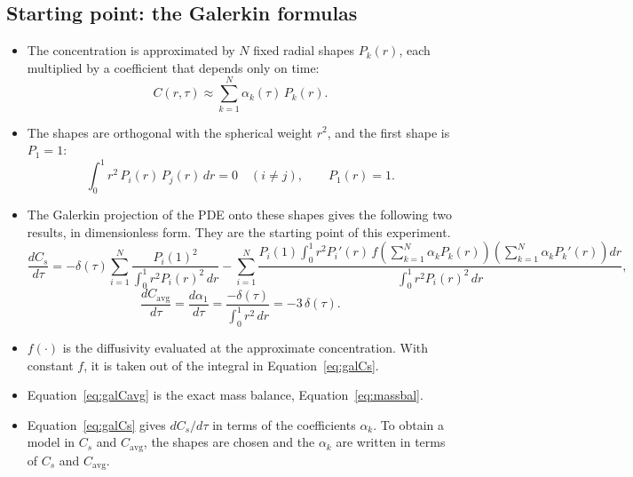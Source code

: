 \documentclass[11pt,a4paper]{article}
\newcommand{\avg}{\mathrm{avg}}
\begin{document}
\subsection{Starting point: the Galerkin formulas}
\begin{itemize}
  \item The concentration is approximated by $N$ fixed radial shapes $P_k(r)$, each multiplied by a coefficient that depends only on time:
  \begin{equation}
    C(r,\tau)\approx\sum_{k=1}^{N}\alpha_k(\tau)\,P_k(r).
  \end{equation}
  \item The shapes are orthogonal with the spherical weight $r^2$, and the first shape is $P_1=1$:
  \begin{equation}\label{eq:orth}
    \int_0^1 r^2\,P_i(r)\,P_j(r)\,dr = 0\quad(i\neq j),\qquad P_1(r)=1.
  \end{equation}
  \item The Galerkin projection of the PDE onto these shapes gives the following two results, in dimensionless form. They are the starting point of this experiment.
  \begin{equation}\label{eq:galCs}
    \frac{dC_s}{d\tau} = -\delta(\tau)\sum_{i=1}^{N}\frac{P_i(1)^2}{\int_0^1 r^2P_i(r)^2\,dr}
    - \sum_{i=1}^{N}\frac{P_i(1)\int_0^1 r^2 P_i'(r)\, f\!\left(\sum_{k=1}^{N}\alpha_kP_k(r)\right)\left(\sum_{k=1}^{N}\alpha_kP_k'(r)\right)dr}{\int_0^1 r^2P_i(r)^2\,dr},
  \end{equation}
  \begin{equation}\label{eq:galCavg}
    \frac{dC_\avg}{d\tau} = \frac{d\alpha_1}{d\tau} = \frac{-\delta(\tau)}{\int_0^1 r^2\,dr} = -3\,\delta(\tau).
  \end{equation}
  \item $f(\cdot)$ is the diffusivity evaluated at the approximate concentration. With constant $f$, it is taken out of the integral in Equation~\eqref{eq:galCs}.
  \item Equation~\eqref{eq:galCavg} is the exact mass balance, Equation~\eqref{eq:massbal}.
  \item Equation~\eqref{eq:galCs} gives $dC_s/d\tau$ in terms of the coefficients $\alpha_k$. To obtain a model in $C_s$ and $C_\avg$, the shapes are chosen and the $\alpha_k$ are written in terms of $C_s$ and $C_\avg$.
\end{itemize}
\end{document}
